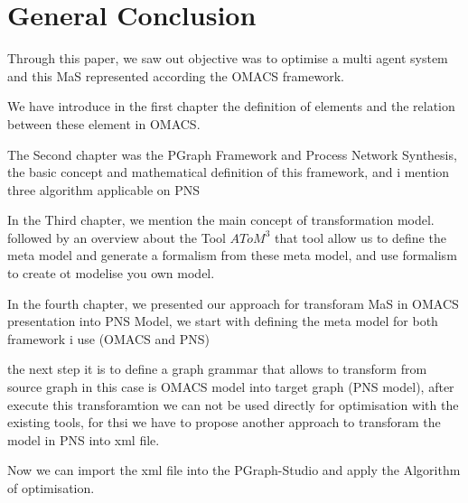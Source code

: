 
\chapter*{General Conclusion}


Through this paper, we saw out objective was to optimise a multi agent system 
and this MaS represented according the OMACS framework.

We have introduce  in the first chapter the definition of elements and the relation between these element in OMACS.

The Second chapter was the  PGraph Framework and  Process Network Synthesis, the basic concept and mathematical definition  of this framework, and i mention 
three algorithm applicable on PNS 

In the Third chapter, we mention the main concept of transformation model. followed by an overview about the Tool $AToM^3$ that tool allow us to define the meta model and generate a formalism from these meta model, and use formalism to create ot modelise you own model. 

In the fourth chapter, we presented our approach for transforam MaS in OMACS presentation into PNS Model, we start with defining the meta model for both framework i use (OMACS and PNS)

the next step it is to define a graph grammar that allows to transform from source graph in this case is OMACS model into target graph (PNS model), after execute this transforamtion we can not be used directly for optimisation with the existing tools, for thsi we have to propose another approach to transforam the model in PNS into xml file.

Now we can import the xml file into the PGraph-Studio and apply the Algorithm of  optimisation.
